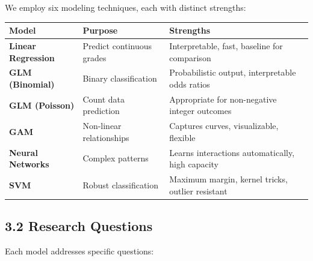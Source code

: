 \documentclass[
]{article}
\newcounter{none} %
\begin{document}
We employ six modeling techniques, each with distinct strengths:

{\def\LTcaptype{none} %
\begin{longtable}[]{@{}
  >{\raggedright\arraybackslash}p{}
  >{\raggedright\arraybackslash}p{}
  >{\raggedright\arraybackslash}p{}@{}}
\toprule\noalign{}
\begin{minipage}[b]{\linewidth}\raggedright
Model
\end{minipage} & \begin{minipage}[b]{\linewidth}\raggedright
Purpose
\end{minipage} & \begin{minipage}[b]{\linewidth}\raggedright
Strengths
\end{minipage} \\
\midrule\noalign{}
\endhead
\bottomrule\noalign{}
\endlastfoot
\textbf{Linear Regression} & Predict continuous grades & Interpretable,
fast, baseline for comparison \\
\textbf{GLM (Binomial)} & Binary classification & Probabilistic output,
interpretable odds ratios \\
\textbf{GLM (Poisson)} & Count data prediction & Appropriate for
non-negative integer outcomes \\
\textbf{GAM} & Non-linear relationships & Captures curves, visualizable,
flexible \\
\textbf{Neural Networks} & Complex patterns & Learns interactions
automatically, high capacity \\
\textbf{SVM} & Robust classification & Maximum margin, kernel tricks,
outlier resistant \\
\end{longtable}
}

\subsection{3.2 Research Questions}\label{research-questions}

Each model addresses specific questions:
\end{document}
